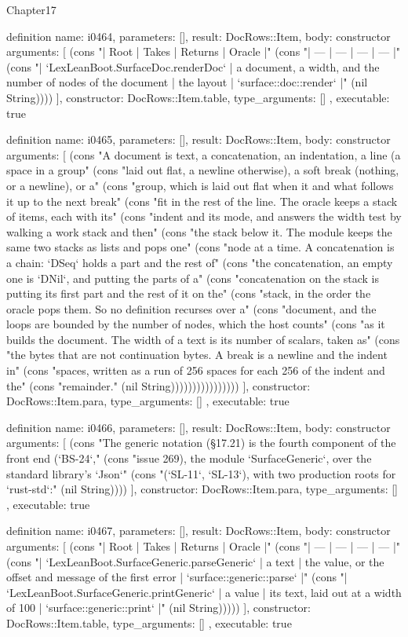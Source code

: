 \begin{lexlean}{Chapter17}
\begin{semanticmodule}
definition{
  name: i0464,
  parameters: [],
  result: DocRows::Item,
  body: constructor{
    arguments: [
      (cons "| Root | Takes | Returns | Oracle |" (cons "| --- | --- | --- | --- |" (cons "| `LexLeanBoot.SurfaceDoc.renderDoc` | a document, a width, and the number of nodes of the document | the layout | `surface::doc::render` |" (nil String))))
    ],
    constructor: DocRows::Item.table,
    type_arguments: []
  },
  executable: true
}

definition{
  name: i0465,
  parameters: [],
  result: DocRows::Item,
  body: constructor{
    arguments: [
      (cons "A document is text, a concatenation, an indentation, a line (a space in a group" (cons "laid out flat, a newline otherwise), a soft break (nothing, or a newline), or a" (cons "group, which is laid out flat when it and what follows it up to the next break" (cons "fit in the rest of the line. The oracle keeps a stack of items, each with its" (cons "indent and its mode, and answers the width test by walking a work stack and then" (cons "the stack below it. The module keeps the same two stacks as lists and pops one" (cons "node at a time. A concatenation is a chain: `DSeq` holds a part and the rest of" (cons "the concatenation, an empty one is `DNil`, and putting the parts of a" (cons "concatenation on the stack is putting its first part and the rest of it on the" (cons "stack, in the order the oracle pops them. So no definition recurses over a" (cons "document, and the loops are bounded by the number of nodes, which the host counts" (cons "as it builds the document. The width of a text is its number of scalars, taken as" (cons "the bytes that are not continuation bytes. A break is a newline and the indent in" (cons "spaces, written as a run of 256 spaces for each 256 of the indent and the" (cons "remainder." (nil String))))))))))))))))
    ],
    constructor: DocRows::Item.para,
    type_arguments: []
  },
  executable: true
}

definition{
  name: i0466,
  parameters: [],
  result: DocRows::Item,
  body: constructor{
    arguments: [
      (cons "The generic notation (§17.21) is the fourth component of the front end (`BS-24`," (cons "issue 269), the module `SurfaceGeneric`, over the standard library's `Json`" (cons "(`SL-11`, `SL-13`), with two production roots for `rust-std`:" (nil String))))
    ],
    constructor: DocRows::Item.para,
    type_arguments: []
  },
  executable: true
}

definition{
  name: i0467,
  parameters: [],
  result: DocRows::Item,
  body: constructor{
    arguments: [
      (cons "| Root | Takes | Returns | Oracle |" (cons "| --- | --- | --- | --- |" (cons "| `LexLeanBoot.SurfaceGeneric.parseGeneric` | a text | the value, or the offset and message of the first error | `surface::generic::parse` |" (cons "| `LexLeanBoot.SurfaceGeneric.printGeneric` | a value | its text, laid out at a width of 100 | `surface::generic::print` |" (nil String)))))
    ],
    constructor: DocRows::Item.table,
    type_arguments: []
  },
  executable: true
}


\end{semanticmodule}
\end{lexlean}
